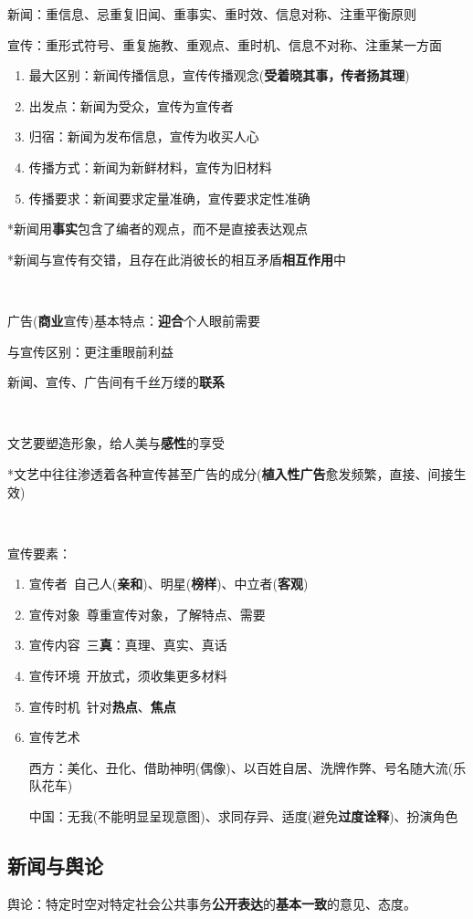 \documentclass[a4paper,UTF8]{ctexart}
\begin{document}
新闻：重信息、忌重复旧闻、重事实、重时效、信息对称、注重平衡原则

宣传：重形式符号、重复施教、重观点、重时机、信息不对称、注重某一方面

\begin{enumerate}
	\item 最大区别：新闻传播信息，宣传传播观念(\textbf{受着晓其事，传者扬其理})
	\item 出发点：新闻为受众，宣传为宣传者
	\item 归宿：新闻为发布信息，宣传为收买人心
	\item 传播方式：新闻为新鲜材料，宣传为旧材料
	\item 传播要求：新闻要求定量准确，宣传要求定性准确
\end{enumerate}

*新闻用\textbf{事实}包含了编者的观点，而不是直接表达观点

*新闻与宣传有交错，且存在此消彼长的相互矛盾\textbf{相互作用}中

~

广告(\textbf{商业}宣传)基本特点：\textbf{迎合}个人眼前需要

与宣传区别：更注重眼前利益

新闻、宣传、广告间有千丝万缕的\textbf{联系}

~

文艺要塑造形象，给人美与\textbf{感性}的享受

*文艺中往往渗透着各种宣传甚至广告的成分(\textbf{植入性广告}愈发频繁，直接、间接生效)

~

宣传要素：

\begin{enumerate}
	\item 宣传者\ 自己人(\textbf{亲和})、明星(\textbf{榜样})、中立者(\textbf{客观})
	\item 宣传对象\ 尊重宣传对象，了解特点、需要
	\item 宣传内容\ 三\textbf{真}：真理、真实、真话
	\item 宣传环境\ 开放式，须收集更多材料
	\item 宣传时机\ 针对\textbf{热点}、\textbf{焦点}
	\item 宣传艺术
	
	西方：美化、丑化、借助神明(偶像)、以百姓自居、洗牌作弊、号名随大流(乐队花车)
	
	中国：无我(不能明显呈现意图)、求同存异、适度(避免\textbf{过度诠释})、扮演角色
\end{enumerate}

\subsection{新闻与舆论}
舆论：特定时空对特定社会公共事务\textbf{公开表达}的\textbf{基本一致}的意见、态度。
\end{document}
